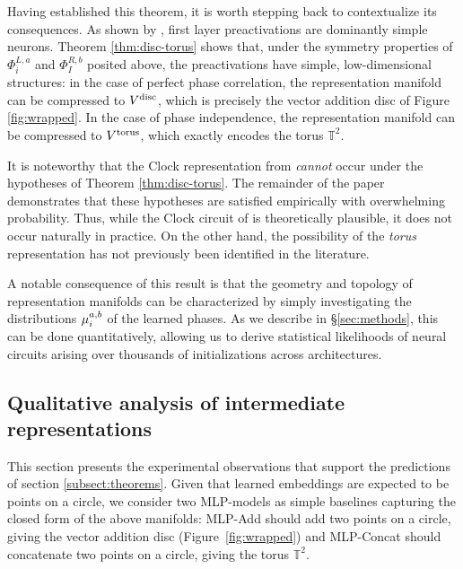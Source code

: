 Having established this theorem, it is worth stepping back to contextualize its consequences.
As shown by \citet{mccracken2025uncoveringuniversalabstractalgorithm}, first layer preactivations are dominantly simple neurons.
Theorem \ref{thm:disc-torus} shows that, under the symmetry properties of $\Phi_i^{L, a}$ and $\Phi_I^{R, b}$ posited above, the preactivations have simple, low-dimensional structures: in the case of perfect phase correlation, the representation manifold can be compressed to $V^{\rm disc}$, which is precisely the vector addition disc of Figure \ref{fig:wrapped}.
In the case of phase independence, the representation manifold can be compressed to $V^{\rm torus}$, which exactly encodes the torus $\mathbb{T}^2$.

\begin{remark}
    It is noteworthy that the Clock representation from \citet{zhong2023the} \emph{cannot} occur under the hypotheses of Theorem \ref{thm:disc-torus}.
    The remainder of the paper demonstrates that these hypotheses are satisfied empirically with overwhelming probability.
    Thus, while the Clock circuit of \citet{zhong2023the} is theoretically plausible, it does not occur naturally in practice.
    On the other hand, the possibility of the \emph{torus} representation has not previously been identified in the literature.
\end{remark}

A notable consequence of this result is that the geometry and topology of representation manifolds can be characterized by simply investigating the distributions $\mu_{i}^{a, b}$ of the learned phases.
As we describe in \S\ref{sec:methods}, this can be done quantitatively, allowing us to derive statistical likelihoods of neural circuits arising over thousands of initializations across architectures.



\subsection{Qualitative analysis of intermediate representations}

This section presents the experimental observations that support the predictions of section \ref{subsect:theorems}. Given that learned embeddings are expected to be points on a circle, we consider two MLP-models as simple baselines capturing the closed form of the above manifolds: MLP-Add should add two points on a circle, giving the vector addition disc (Figure~\ref{fig:wrapped}) and MLP-Concat should concatenate two points on a circle, giving the torus $\mathbb{T}^2$. 

